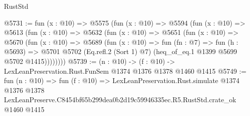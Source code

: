 \begin{lexlean}{RustStd}
\begin{coremodule}
@5731 := fun (x : @10) =>
  @5575
    (fun (x : @10) =>
    @5594
      (fun (x : @10) =>
      @5613
        (fun (x : @10) =>
        @5632
          (fun (x : @10) =>
          @5651
            (fun (x : @10) =>
            @5670
              (fun (x : @10) =>
              @5689
                (fun (x : @10) =>
                fun (fn : @7) =>
                fun (h : @5693) =>
                @5701 @5702 (Eq.refl.{2} (Sort 1) @7) (heq_of_eq.{1} @1399 @5699 @5702 @1415))))))))
@5739 := (n : @10) -> (f : @10) -> LexLeanPreservation.Rust.FunSem @1374 @1376 @1378 @1460 @1415
@5749 := fun (n : @10) =>
  fun (f : @10) =>
  LexLeanPreservation.Rust.simulate
    @1374
    @1376
    @1378
    LexLeanPreserve.C8454bf65b299dea0b2d19c59946335ec.R5.RustStd.crate_ok
    @1460
    @1415
\end{coremodule}
\end{lexlean}
